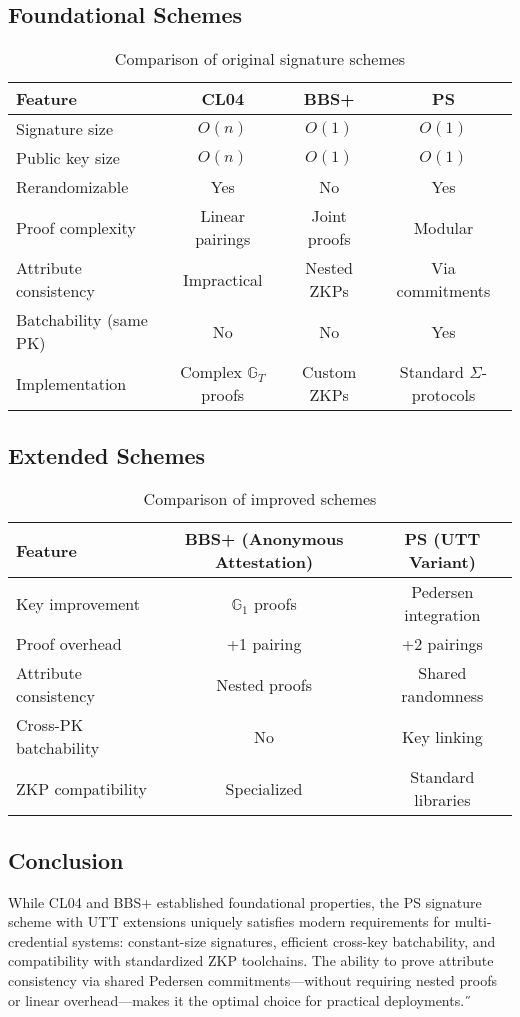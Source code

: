 {\subsection{Foundational Schemes}
\begin{table}[ht]
\centering
\caption{Comparison of original signature schemes}
\label{tab:original-schemes}
\begin{tabular}{lccc}
\toprule
\textbf{Feature} & \textbf{CL04} & \textbf{BBS+} & \textbf{PS} \\
\midrule
Signature size & $O(n)$ & $O(1)$ & $O(1)$ \\
Public key size & $O(n)$ & $O(1)$ & $O(1)$ \\
Rerandomizable & Yes & No & Yes \\
Proof complexity & Linear pairings & Joint proofs & Modular \\
Attribute consistency & Impractical & Nested ZKPs & Via commitments \\
Batchability (same PK) & No & No & Yes \\
Implementation & Complex $\mathbb{G}_T$ proofs & Custom ZKPs & Standard $\Sigma$-protocols \\
\bottomrule
\end{tabular}
\end{table}

\subsection{Extended Schemes}
\begin{table}[ht]
\centering
\caption{Comparison of improved schemes}
\label{tab:improved-schemes}
\begin{tabular}{lcc}
\toprule
\textbf{Feature} & \textbf{BBS+ (Anonymous Attestation)} & \textbf{PS (UTT Variant)} \\
\midrule
Key improvement & $\mathbb{G}_1$ proofs & Pedersen integration \\
Proof overhead & +1 pairing & +2 pairings \\
Attribute consistency & Nested proofs & Shared randomness \\
Cross-PK batchability & No & Key linking \\
ZKP compatibility & Specialized & Standard libraries \\
\bottomrule 
\end{tabular}
\end{table}



\subsection{Conclusion}
While CL04 and BBS+ established foundational properties, the PS signature scheme with UTT extensions uniquely satisfies modern requirements for multi-credential systems: constant-size signatures, efficient cross-key batchability, and compatibility with standardized ZKP toolchains. The ability to prove attribute consistency via shared Pedersen commitments—without requiring nested proofs or linear overhead—makes it the optimal choice for practical deployments.˝





}

